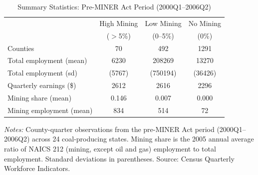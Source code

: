 \begin{table}[htbp]
\centering
\caption{Summary Statistics: Pre-MINER Act Period (2000Q1--2006Q2)}
\label{tab:summary}
\begin{threeparttable}
\begin{tabular}{lccc}
\toprule
 & High Mining & Low Mining & No Mining \\
 & ($>$5\%) & (0--5\%) & (0\%) \\
\midrule
Counties & 70 & 492 & 1291 \\
Total employment (mean) & 6230 & 208269 & 13270 \\
Total employment (sd) & (5767) & (750194) & (36426) \\
Quarterly earnings (\$) & 2612 & 2616 & 2296 \\
Mining share (mean) & 0.146 & 0.007 & 0.000 \\
Mining employment (mean) & 834 & 514 & 72 \\
\bottomrule
\end{tabular}
\begin{tablenotes}[flushleft]
\small
\item \textit{Notes:} County-quarter observations from the pre-MINER Act period (2000Q1--2006Q2) across 24 coal-producing states. Mining share is the 2005 annual average ratio of NAICS 212 (mining, except oil and gas) employment to total employment. Standard deviations in parentheses. Source: Census Quarterly Workforce Indicators.
\end{tablenotes}
\end{threeparttable}
\end{table}
